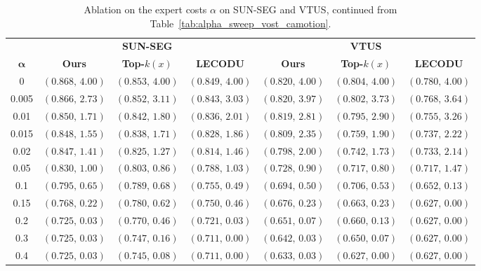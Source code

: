 \begin{table}[t]
\caption{Ablation on the expert costs \(\alpha\) on SUN-SEG and
VTUS, continued from Table~\ref{tab:alpha_sweep_vost_camotion}.}
\label{tab:alpha_sweep_sunseg_vtus}

\centering
\setlength{\tabcolsep}{4pt}
\renewcommand{\arraystretch}{1.08}
{\small
\begin{tabular}{@{}c*{6}{c}@{}}
\toprule
&
\multicolumn{3}{c}{\textbf{SUN-SEG}}
&
\multicolumn{3}{c}{\textbf{VTUS}}
\\
\cmidrule(lr){2-4}
\cmidrule(lr){5-7}

\(\boldsymbol{\alpha}\)
& \textbf{Ours}
& \textbf{Top-\(k(x)\)}
& \textbf{LECODU}
& \textbf{Ours}
& \textbf{Top-\(k(x)\)}
& \textbf{LECODU}
\\
\midrule

0
& \((0.868,\,4.00)\)
& \((0.853,\,4.00)\)
& \((0.849,\,4.00)\)
& \((0.820,\,4.00)\)
& \((0.804,\,4.00)\)
& \((0.780,\,4.00)\)
\\

0.005
& \((0.866,\,2.73)\)
& \((0.852,\,3.11)\)
& \((0.843,\,3.03)\)
& \((0.820,\,3.97)\)
& \((0.802,\,3.73)\)
& \((0.768,\,3.64)\)
\\

0.01
& \((0.850,\,1.71)\)
& \((0.842,\,1.80)\)
& \((0.836,\,2.01)\)
& \((0.819,\,2.81)\)
& \((0.795,\,2.90)\)
& \((0.755,\,3.26)\)
\\

0.015
& \((0.848,\,1.55)\)
& \((0.838,\,1.71)\)
& \((0.828,\,1.86)\)
& \((0.809,\,2.35)\)
& \((0.759,\,1.90)\)
& \((0.737,\,2.22)\)
\\

0.02
& \((0.847,\,1.41)\)
& \((0.825,\,1.27)\)
& \((0.814,\,1.46)\)
& \((0.798,\,2.00)\)
& \((0.742,\,1.73)\)
& \((0.733,\,2.14)\)
\\

0.05
& \((0.830,\,1.00)\)
& \((0.803,\,0.86)\)
& \((0.788,\,1.03)\)
& \((0.728,\,0.90)\)
& \((0.717,\,0.80)\)
& \((0.717,\,1.47)\)
\\

0.1
& \((0.795,\,0.65)\)
& \((0.789,\,0.68)\)
& \((0.755,\,0.49)\)
& \((0.694,\,0.50)\)
& \((0.706,\,0.53)\)
& \((0.652,\,0.13)\)
\\

0.15
& \((0.768,\,0.22)\)
& \((0.780,\,0.62)\)
& \((0.750,\,0.46)\)
& \((0.676,\,0.23)\)
& \((0.663,\,0.23)\)
& \((0.627,\,0.00)\)
\\

0.2
& \((0.725,\,0.03)\)
& \((0.770,\,0.46)\)
& \((0.721,\,0.03)\)
& \((0.651,\,0.07)\)
& \((0.660,\,0.13)\)
& \((0.627,\,0.00)\)
\\

0.3
& \((0.725,\,0.03)\)
& \((0.747,\,0.16)\)
& \((0.711,\,0.00)\)
& \((0.642,\,0.03)\)
& \((0.650,\,0.07)\)
& \((0.627,\,0.00)\)
\\

0.4
& \((0.725,\,0.03)\)
& \((0.745,\,0.08)\)
& \((0.711,\,0.00)\)
& \((0.633,\,0.03)\)
& \((0.627,\,0.00)\)
& \((0.627,\,0.00)\)
\\

\bottomrule
\end{tabular}
}

\end{table}
